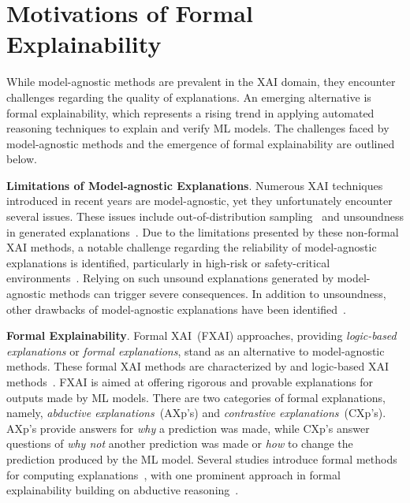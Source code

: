 \section{Motivations of Formal Explainability} \label{sec:motiv}

While model-agnostic methods are prevalent in the XAI domain, 
they encounter challenges regarding the quality of explanations. 
%
An emerging alternative is formal explainability, which represents a
rising trend in applying automated reasoning techniques to explain and 
verify ML models.
%
The challenges faced by model-agnostic methods 
and the emergence of formal explainability 
are outlined below.


\textbf{Limitations of Model-agnostic Explanations}.
Numerous XAI techniques introduced in recent years are 
model-agnostic, yet they unfortunately encounter several issues.
%
These issues include out-of-distribution sampling~\cite{lakkaraju-aies20a,lb-aies20,yis-corr23,yfis-corr23}
and unsoundness in generated explanations~\cite{inms-corr19,nsmims-sat19,ignatiev-ijcai20,msi-aaai22}.
%
Due to the limitations presented by these non-formal XAI methods,
a notable challenge regarding the reliability of model-agnostic explanations is identified, 
particularly in high-risk or safety-critical environments~\cite{rudin-nature22,rudin-natmi19,vw-pt21,raai-sp19,dmbt-comp17,hcw-chb21,ms-rw22}.
%
Relying on such unsound explanations generated by model-agnostic methods can trigger severe consequences.
%
In addition to unsoundness, other drawbacks of model-agnostic explanations have been identified~\cite{cgflb-corr19,dbjw-ecai20,kvsf-icml20,jmb-aistats20,hms-corr23,hms-corr23b,hms-corr23c}.

\textbf{Formal Explainability}.
%
Formal XAI~(FXAI) approaches, providing \emph{logic-based explanations} or 
\emph{formal explanations},
stand as an alternative to  model-agnostic methods.
%
These formal XAI methods are characterized by 
and logic-based XAI methods~\cite{ignatiev-ijcai20,msi-aaai22,darwiche-lics23,ms-rw22}.
%
FXAI is aimed at offering rigorous and provable explanations for 
outputs made by ML models.
%
There are two categories of formal explanations, namely,
\emph{abductive explanations}~(AXp’s) and \emph{contrastive explanations}~(CXp’s).
%
AXp's provide answers for \emph{why} a prediction was made, 
while CXp's answer questions of \emph{why not} another prediction was made
or \emph{how} to change the prediction produced by the ML model. 
%
Several studies introduce formal methods for computing explanations~\cite{amgoud-ecsqaru21,ll-clar21,rcblt-ai21,rcbt-kr20,wgh-aies19}, with one prominent
approach in formal explainability building on abductive reasoning~\cite{inms-corr19,inms-aaai19,ignatiev-ijcai20,msgcin-nips20,ims-sat21,msi-aaai22,imsns-ijcai21,hiicams-aaai22,barcelo-nips22,hiims-kr21,hims-aaai23,huang-tacas23,ims-ijcai21,msgcin-icml21,yisnms-aaai23,snimmsv-aaai22,nsmims-sat19}.

